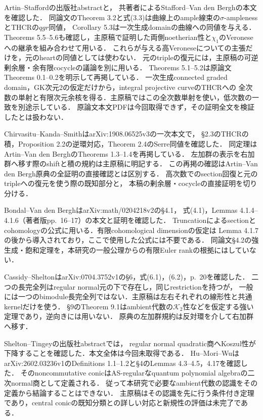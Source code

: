 \documentclass[11pt,a4paper]{ltjsarticle}
\begin{document}
\begin{description}[style=nextline]
Artin--Stafford\cite{ASquadratic}の出版社abstractと，
共著者によるStafford--Van den Bergh\cite[\S5, Theorems 5.1--5.2, pp.~13--14]{SVdBsurvey}の本文を確認した．
同論文のTheorem 3.2と式(3.3)は曲線上のample線束の$\sigma$-amplenessとTHCRの$qgr$同値，
Corollary 5.3は一次生成domainの曲線への同値を与える．
Theorems 5.5--5.6も確認し，主原稿で証明した両側noetherian性と$\chi_1$のVeroneseへの継承を組み合わせて用いる．
これらが与える高Veroneseについての主張だけを，元のheartの同値としては使わない．
元のtripleの復元には，主原稿の可逆剰余層・余有限cocycleの議論を別に用いる．
Theorems 5.1--5.2は原論文Theorems 0.1--0.2を明示して再掲している．
一次生成connected graded domain，GK次元2の仮定だけから，integral projective curveのTHCRへの
全次数の単射と有限次元余核を得る．主原稿ではこの全次数単射を使い，低次数の一致を別途示している．
原論文本文PDFは今回取得できず，その証明全文を検証したとは扱わない．

Chirvasitu--Kanda--Smith\cite{CKSTHCR}はarXiv:1908.06525v3の一次本文で，
\S2.3のTHCRの積，Proposition 2.2の逆環対応，Theorem 2.4のSerre同値を確認した．
同定理はArtin--Van den BerghのTheorems 1.3--1.4を再掲している．
左加群の表示を右加群へ移す際のshiftと積の規約は主原稿に明記する．
この再掲の確認はArtin--Van den Bergh原典の全証明の直接確認とは区別する．
高次数でのsection回復と元のtripleへの復元を使う際の既知部分と，
本稿の剰余層・cocycleの直接証明を切り分ける．

Bondal--Van den Bergh\cite{BvdBGenerators}はarXiv:math/0204218v2の\S4.1，
式(4.1)，Lemmas 4.1.4--4.1.6（著者版pp.~16--17）の本文と証明を確認した．
Truncationによるsectionとcohomologyの公式に用いる．有限cohomological dimensionの仮定は
Lemma 4.1.7の後から導入されており，ここで使用した公式には不要である．
同論文\S4.2の強生成・飽和定理を，本研究の一般公理からの有限Euler rankの根拠にはしていない．

Cassidy--Shelton\cite{CassidyShelton}はarXiv:0704.3752v1の\S6，式(6.1)，(6.2)，p.~20を確認した．
二つの長完全列はregular normal元の下で存在し，同じrestrictionを持つが，
一般には一つのbimodule長完全列ではない．主原稿は左右それぞれの線形性と共通kernelだけを使う．
\S9のTheorem 9.1はambient代数の$\mathcal K_2$性などを仮定する強い定理であり，逆向きには用いない．
原典の左加群規約は反対環を介して右加群へ移す．

Shelton--Tingey\cite{SheltonTingey}の出版社abstractでは，
regular normal quadratic商へKoszul性が下降することを確認した．本文全体は今回未取得である．
Hu--Mori--Wu\cite{HuMoriWu}はarXiv:2602.03236v1のDefinitions 1.1--1.2と\S4のLemmas 4.3--4.5，4.17を確認した．
そのnoncommutative conicはAS-regularなquantum polynomial algebraの二次normal商として定義される．
従って本研究で必要なambient代数の認識をその定義から結論することはできない．
主原稿はその認識を先に行う条件付き定理であり，central conicの既知分類との詳しい対応と新規性の評価は未完了である．


\end{description}
\end{document}
